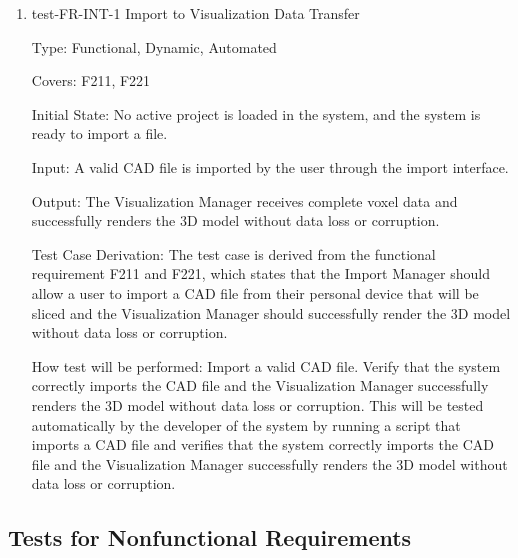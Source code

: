 \documentclass[12pt, titlepage]{article}
\begin{document}
\begin{enumerate}

\item{test-FR-INT-1 Import to Visualization Data Transfer\\}

Type: Functional, Dynamic, Automated

Covers: F211, F221
					
Initial State: No active project is loaded in the system, and the system is ready to import a file.
					
Input: A valid CAD file is imported by the user through the import interface.
					
Output: The Visualization Manager receives complete voxel data and successfully renders the 3D model without data loss or corruption.

Test Case Derivation: The test case is derived from the functional requirement F211 and F221, which states that the Import Manager should allow a user to import a CAD file from their personal device that will be sliced and the Visualization Manager should successfully render the 3D model without data loss or corruption.
					
How test will be performed: Import a valid CAD file. Verify that the system correctly imports the CAD file and the Visualization Manager successfully renders the 3D model without data loss or corruption. This will be tested automatically by the developer of the system by running a script that imports a CAD file and verifies that the system correctly imports the CAD file and the Visualization Manager successfully renders the 3D model without data loss or corruption.


\end{enumerate}

\subsection{Tests for Nonfunctional Requirements}
\iffalse
{}

\end{document}
